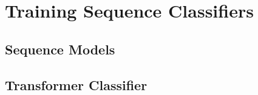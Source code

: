 \section{Training Sequence Classifiers}
\label{sec:seq-classifiers}

\subsection{Sequence Models}
\label{sec:seq-classifiers:seq-models}




\subsection{Transformer Classifier}
\label{sec:seq-classifiers:location-rank}


